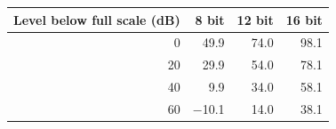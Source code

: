 \begin{tabular}{rrrr}
\toprule
Level below full scale (dB) & 8 bit & 12 bit & 16 bit \\
\midrule
0 & 49.9 & 74.0 & 98.1 \\
20 & 29.9 & 54.0 & 78.1 \\
40 & 9.9 & 34.0 & 58.1 \\
60 & $-$10.1 & 14.0 & 38.1 \\
\bottomrule
\end{tabular}
